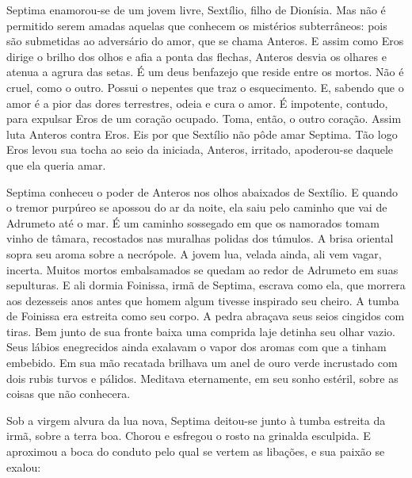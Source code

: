 Septima enamorou-se de um jovem livre, Sextílio, filho de Dionísia. Mas não
é permitido serem amadas aquelas que conhecem os mistérios subterrâneos:
pois são submetidas ao adversário do amor, que se chama Anteros. E assim
como Eros dirige o brilho dos olhos e afia a ponta das flechas, Anteros
desvia os olhares e atenua a agrura das setas. É um deus benfazejo que
reside entre os mortos. Não é cruel, como o outro. Possui o nepentes que
traz o esquecimento. E, sabendo que o amor é a pior das dores terrestres,
odeia e cura o amor. É impotente, contudo, para expulsar Eros de um
coração ocupado. Toma, então, o outro coração. Assim luta Anteros contra
Eros. Eis por que Sextílio não pôde amar Septima. Tão logo Eros levou sua
tocha ao seio da iniciada, Anteros, irritado, apoderou-se daquele que ela
queria amar.

Septima conheceu o poder de Anteros nos olhos abaixados de Sextílio. E
quando o tremor purpúreo se apossou do ar da noite, ela saiu pelo caminho
que vai de Adrumeto até o mar. É um caminho sossegado em que os namorados
tomam vinho de tâmara, recostados nas muralhas polidas dos túmulos. A
brisa oriental sopra seu aroma sobre a necrópole. A jovem lua, velada
ainda, ali vem vagar, incerta. Muitos mortos embalsamados se quedam ao
redor de Adrumeto em suas sepulturas. E ali dormia Foinissa, irmã de
Septima, escrava como ela, que morrera aos dezesseis anos antes que homem
algum tivesse inspirado seu cheiro. A tumba de Foinissa era estreita como
seu corpo. A pedra abraçava seus seios cingidos com tiras. Bem junto de
sua fronte baixa uma comprida laje detinha seu olhar vazio. Seus lábios
enegrecidos ainda exalavam o vapor dos aromas com que a tinham embebido.
Em sua mão recatada brilhava um anel de ouro verde incrustado com dois
rubis turvos e pálidos. Meditava eternamente, em seu sonho estéril, sobre
as coisas que não conhecera.

Sob a virgem alvura da lua nova, Septima deitou-se junto à tumba estreita
da irmã, sobre a terra boa. Chorou e esfregou o rosto na grinalda
esculpida. E aproximou a boca do conduto pelo qual se vertem as libações,
e sua paixão se exalou:

